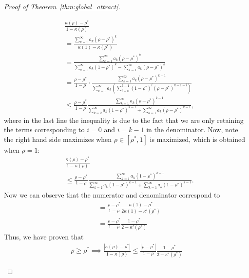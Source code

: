 \documentclass[twoside]{article}
\theoremstyle{definition}
\begin{document}
\begin{proof}[Proof of Theorem~\ref{thm:global_attract}]
\begin{itemize}
\begin{align*}
&\frac{\kappa(\rho)-\rho^*}{1-\kappa(\rho)} \\
&= \frac{\sum_{k=1}^\infty a_k (\rho-\rho^*)^k}{\kappa(1)- \kappa(\rho^*)}\\
&= \frac{\sum_{k=1}^\infty a_k (\rho-\rho^*)^k}{\sum_{k=1}^\infty a_k (1-\rho^*)^k - \sum_{k=1}^\infty a_k (\rho-\rho^*)^k}  \\
&= \frac{\rho-\rho^*}{1-\rho}\cdot\frac{\sum_{k=1}^\infty a_k (\rho-\rho^*)^{k-1}}{\sum_{k=1}^\infty a_k (\sum_{i=0}^{k-1}(1-\rho^*)^i(\rho-\rho^*)^{k-1-i})}\\
&\le \frac{\rho-\rho^*}{1-\rho}\frac{\sum_{k=1}^\infty a_k (\rho-\rho^*)^{k-1}}{\sum_{k=2}^\infty a_k (1-\rho^*)^{k-1} + \sum_{k=1}^\infty a_k (\rho-\rho^*)^{k-1}},
\end{align*}
where in the last line the inequality is due to the fact that we are only retaining the terms corresponding to $i=0$ and $i=k-1$ in the denominator.
Now, note the right hand side maximizes when $\rho\in[\rho^*,1]$ is maximized, which is obtained when $\rho=1$:
\begin{align*}
&\frac{\kappa(\rho)-\rho^*}{1-\kappa(\rho)}\\
&\le \frac{\rho-\rho^*}{1-\rho}\frac{\sum_{k=1}^\infty a_k (1-\rho^*)^{k-1}}{\sum_{k=2}^\infty a_k (1-\rho^*)^{k-1} + \sum_{k=1}^\infty a_k (1-\rho^*)^{k-1}}.
\end{align*}
Now we can observe that the numerator and denominator correspond to 
\begin{align*}
    &=\frac{\rho-\rho^*}{1-\rho}\frac{\kappa(1)-\rho^*}{2\kappa(1)-\kappa'(\rho^*)}\\
&=\frac{\rho-\rho^*}{1-\rho}\frac{1-\rho^*}{2-\kappa'(\rho^*)}
\end{align*}
Thus, we have proven that 
\begin{align*}
\rho \ge \rho^* \implies \frac{|\kappa(\rho)-\rho^*|}{1-\kappa(\rho)} \le \frac{|\rho-\rho^*|}{1-\rho} \frac{1-\rho^*}{2-\kappa'(\rho^*)}
\end{align*}


\end{itemize}
\end{proof}
\end{document}
